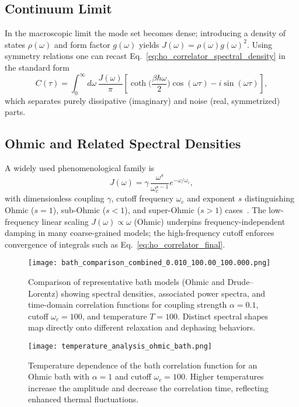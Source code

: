 \subsection{Continuum Limit}
\label{subsec:continuum_limit}
In the macroscopic limit the mode set becomes dense; introducing a density of states $\rho(\omega)$ and form factor $g(\omega)$ yields $J(\omega)=\rho(\omega) g(\omega)^2$. Using symmetry relations one can recast Eq.~\eqref{eq:ho_correlator_spectral_density} in the standard form
\begin{equation} \label{eq:ho_correlator_final}
	C(\tau) = \int_{0}^{\infty} d\omega \, \frac{J(\omega)}{\pi} \left[ \coth\Big(\frac{\beta \hbar \omega}{2}\Big) \cos(\omega \tau) - i \sin(\omega \tau) \right],
\end{equation}
which separates purely dissipative (imaginary) and noise (real, symmetrized) parts.

\subsection{Ohmic and Related Spectral Densities}
\label{subsec:ohmic_spectral_density}
A widely used phenomenological family is
\begin{equation} \label{eq:ho_ohmic_spectral_density}
	J(\omega) = \gamma \, \frac{\omega^{s}}{\omega_c^{s-1}} e^{-\omega/\omega_c},
\end{equation}
with dimensionless coupling $\gamma$, cutoff frequency $\omega_c$ and exponent $s$ distinguishing Ohmic ($s=1$), sub-Ohmic ($s<1$), and super-Ohmic ($s>1$) cases~\cite{weiss2012quantumdissipativesystems, lambertetal2024qutip5quantum}. The low-frequency linear scaling $J(\omega) \propto \omega$ (Ohmic) underpins frequency-independent damping in many coarse-grained models; the high-frequency cutoff enforces convergence of integrals such as Eq.~\eqref{eq:ho_correlator_final}.

\begin{figure}[t]
	\centering
	\texttt{[image: bath\_comparison\_combined\_0.010\_100.00\_100.000.png]}
	\caption{Comparison of representative bath models (Ohmic and Drude--Lorentz) showing spectral densities, associated power spectra, and time-domain correlation functions for coupling strength $\alpha = 0.1$, cutoff $\omega_c = 100$, and temperature $T=100$. Distinct spectral shapes map directly onto different relaxation and dephasing behaviors.}
	\label{fig:bath_comparison}
\end{figure}

\begin{figure}
	\centering
	\texttt{[image: temperature\_analysis\_ohmic\_bath.png]}
	\caption{Temperature dependence of the bath correlation function for an Ohmic bath with $\alpha = 1$ and cutoff $\omega_c = 100$. Higher temperatures increase the amplitude and decrease the correlation time, reflecting enhanced thermal fluctuations.}
	\label{fig:bath_temperature_comparison}
\end{figure}